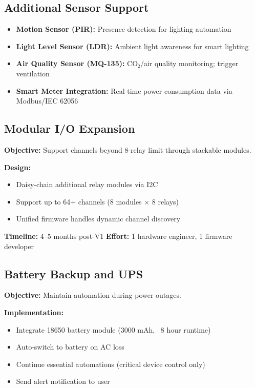 \subsection{Additional Sensor Support}

\begin{itemize}
    \item \textbf{Motion Sensor (PIR):} Presence detection for lighting automation
    \item \textbf{Light Level Sensor (LDR):} Ambient light awareness for smart lighting
    \item \textbf{Air Quality Sensor (MQ-135):} CO₂/air quality monitoring; trigger ventilation
    \item \textbf{Smart Meter Integration:} Real-time power consumption data via Modbus/IEC 62056
\end{itemize}

\subsection{Modular I/O Expansion}

\textbf{Objective:} Support channels beyond 8-relay limit through stackable modules.

\textbf{Design:}
\begin{itemize}
    \item Daisy-chain additional relay modules via I2C
    \item Support up to 64+ channels (8 modules × 8 relays)
    \item Unified firmware handles dynamic channel discovery
\end{itemize}

\textbf{Timeline:} 4–5 months post-V1
\textbf{Effort:} 1 hardware engineer, 1 firmware developer

\subsection{Battery Backup and UPS}

\textbf{Objective:} Maintain automation during power outages.

\textbf{Implementation:}
\begin{itemize}
    \item Integrate 18650 battery module (3000 mAh, ~8 hour runtime)
    \item Auto-switch to battery on AC loss
    \item Continue essential automations (critical device control only)
    \item Send alert notification to user
\end{itemize}

